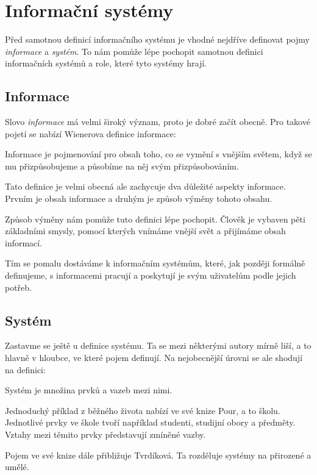 \section{Informační systémy}
Před samotnou definicí informačního systému je vhodné nejdříve definovat pojmy \textit{informace} a \textit{systém}. To nám pomůže lépe pochopit samotnou definici informačních systémů a role, které tyto systémy hrají.
\subsection{Informace}
Slovo \textit{informace} má velmi široký význam, proto je dobré začít obecně. Pro takové pojetí se nabízí Wienerova definice informace:
\begin{definition}
Informace je pojmenování pro obsah toho, co se vymění s vnějším světem, když se mu přizpůsobujeme a působíme na něj svým přizpůsobováním. \cite{Wiener1963}
\end{definition}
Tato definice je velmi obecná ale zachycuje dva důležité aspekty informace. Prvním je obsah informace a druhým je způsob výměny tohoto obsahu. 

Způsob výměny nám pomůže tuto definici lépe pochopit. Člověk je vybaven pěti základními smysly, pomocí kterých vnímáme vnější svět a přijímáme obsah informací.

Tím se pomalu dostáváme k informačním systémům, které, jak později formálně definujeme, s informacemi pracují a poskytují je svým uživatelům podle jejich potřeb.
\subsection{Systém}
Zastavme se ještě u definice systému. Ta se mezi některými autory mírně liší, a to hlavně v hloubce, ve které pojem definují. \cite{Tvrdikova2008}\cite{Pour2015}\cite{Vymetal2009} Na nejobecnější úrovni se ale shodují na definici:
\begin{definition}
Systém je množina prvků a vazeb mezi nimi.
\end{definition}

Jednoduchý příklad z běžného života nabízí ve své knize Pour, a to školu. Jednotlivé prvky ve škole tvoří například studenti, studijní obory a předměty. Vztahy mezi těmito prvky představují zmíněné vazby. \cite{Pour2015}

Pojem ve své knize dále přibližuje Tvrdíková. Ta rozděluje systémy na přirozené a umělé. 

